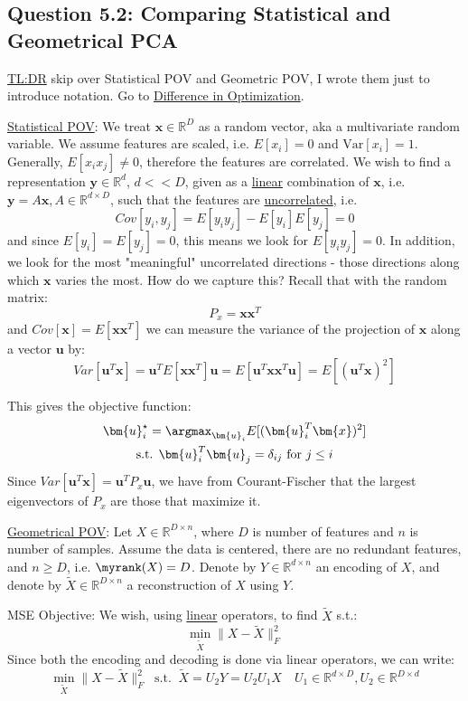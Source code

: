 \documentclass{article}
\begin{document}
\subsection*{Question 5.2: Comparing Statistical and Geometrical PCA}
\ul{TL:DR} skip over Statistical POV and Geometric POV, I wrote them just to introduce notation. Go to \ul{Difference in Optimization}. 


\ul{Statistical POV}: We treat $\bm{x} \in \mathbb{R}^{D}$ as a random vector, aka a multivariate random variable. We assume features are scaled, i.e. $E[x_i]=0$ and $\text{Var}[x_i]=1$.  Generally, $E[x_i x_j] \neq 0$, therefore the features are correlated. We wish to find a representation $\bm{y} \in \mathbb{R}^{d}$, $d <<D$, given as a \ul{linear} combination of $\bm{x}$, i.e. $\bm{y}=A \bm{x}, A \in \mathbb{R}^{d \times D}$, such that the features are \ul{uncorrelated}, i.e.
\[
  Cov[y_i,y_j]= E[y_i y_j] - E[y_i] E[y_j] =  0
\]
and since $E[y_i]=E[y_j]=0$, this means we look for $E[y_i y_j]=0$. In addition, we look for the most "meaningful" uncorrelated directions - those directions along which $\bm{x}$ varies the most. How do we capture this? Recall that with the random matrix:
\[
  P_{x} = \bm{x} \bm{x}^{T}
\]
and $Cov[\bm{x}] = E[\bm{x} \bm{x}^{T}]$
we can measure the variance of the projection of $\bm{x}$ along a vector $\bm{u}$ by:
\[
  Var[\bm{u} ^{T} \bm{x}] = \bm{u}^{T} E[\bm{x} \bm{x}^{T}] \bm{u} = E[\bm{u}^{T} \bm{x} \bm{x} ^{T} \bm{u}] = E[(\bm{u}^{T} \bm{x}) ^2]
\]

This gives the objective function:
\begin{gather*}
  \bm{u}_{i} ^{\star} = \argmax_{\bm{u}_i} E[(\bm{u}_i ^{T} \bm{x})^2]   \\
  \text{s.t. } \bm{u}_i ^{T} \bm{u}_{j} = \delta_{ij} \text{ for } j \leq i
\end{gather*}
Since $Var[\bm{u}^{T} \bm{x}] = \bm{u}^{T} P_{x} \bm{u}$, we have from Courant-Fischer that the largest eigenvectors of $P_{x}$ are those that maximize it. 


\ul{Geometrical POV}: Let $X \in \mathbb{R}^{D \times  n}$, where $D$ is number of features and $n$ is number of samples. Assume the data is centered, there are no redundant features, and $n \geq D$, i.e. $\myrank(X) = D$.  Denote by $Y \in \mathbb{R}^{d \times  n}$ an encoding of $X$, and denote by   $\widetilde{X} \in \mathbb{R}^{D \times  n}$ a reconstruction of $X$ using $Y$.


MSE Objective: We wish, using \ul{linear} operators, to find $\widetilde{X}$ s.t.:
  \[
    \min_{\widetilde{X}} \lVert X - \widetilde{X} \rVert_{F}^2
  \]
Since both the encoding and decoding is done via linear operators, we can write:
\[
  \min_{\widetilde{X}} \lVert X - \widetilde{X} \rVert_{F}^2 \ \text{ s.t. } \ \widetilde{X} = U_{2}Y = U_{2} U_{1}X \quad  U_1 \in \mathbb{R}^{d \times  D}, U_2 \in \mathbb{R}^{D \times d}
\]
\end{document}
